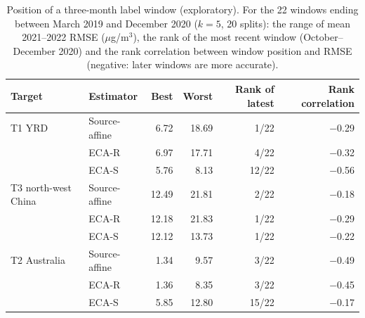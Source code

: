 \begin{table}[H]
\centering
\footnotesize
\caption{Position of a three-month label window (exploratory). For the 22 windows ending between March 2019 and December 2020 ($k=5$, 20 splits): the range of mean 2021--2022 RMSE ($\mu$g/m$^3$), the rank of the most recent window (October--December 2020) and the rank correlation between window position and RMSE (negative: later windows are more accurate).}
\label{tab:explore-windows}
\setlength{\tabcolsep}{4pt}
\begin{tabular}{@{}llrrrr@{}}
\toprule
Target & Estimator & Best & Worst & Rank of latest & Rank correlation \\
\midrule
T1 YRD & Source-affine & 6.72 & 18.69 & 1/22 & $-$0.29 \\
 & ECA-R & 6.97 & 17.71 & 4/22 & $-$0.32 \\
 & ECA-S & 5.76 & 8.13 & 12/22 & $-$0.56 \\
\addlinespace
T3 north-west China & Source-affine & 12.49 & 21.81 & 2/22 & $-$0.18 \\
 & ECA-R & 12.18 & 21.83 & 1/22 & $-$0.29 \\
 & ECA-S & 12.12 & 13.73 & 1/22 & $-$0.22 \\
\addlinespace
T2 Australia & Source-affine & 1.34 & 9.57 & 3/22 & $-$0.49 \\
 & ECA-R & 1.36 & 8.35 & 3/22 & $-$0.45 \\
 & ECA-S & 5.85 & 12.80 & 15/22 & $-$0.17 \\
\bottomrule
\end{tabular}
\end{table}
